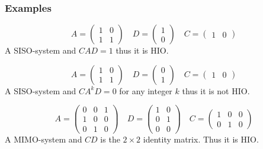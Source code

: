 \subsubsection{Examples}

\begin{example}{}{}
	\begin{equation}
	A = \begin{pmatrix}
	1 & 0 \\ 1 & 1
	\end{pmatrix}
	\quad
	D = \begin{pmatrix}
	1 \\ 0
	\end{pmatrix}
	\quad 
	C = \begin{pmatrix}
	1 & 0
	\end{pmatrix}
	\end{equation}
	A SISO-system and $CAD=1$ thus it is HIO.
\end{example}
\begin{example}{}{}
	\begin{equation}
	A = \begin{pmatrix}
	1 & 0 \\ 1 & 1
	\end{pmatrix}
	\quad
	D = \begin{pmatrix}
	0 \\ 1
	\end{pmatrix}
	\quad 
	C = \begin{pmatrix}
	1 & 0
	\end{pmatrix}
	\end{equation}
	A SISO-system and $CA^kD=0$ for any integer $k$ thus it is not HIO.
\end{example}
\begin{example}{}{}
	\begin{equation}
	A = \begin{pmatrix}
	0 & 0  & 1\\ 1 & 0 & 0 \\ 0 & 1 & 0
	\end{pmatrix}
	\quad
	D = \begin{pmatrix}
	1  & 0\\ 0 & 1 \\ 0 & 0
	\end{pmatrix}
	\quad 
	C = \begin{pmatrix}
	1 & 0 & 0 \\ 0 & 1 & 0
	\end{pmatrix}
	\end{equation}
	A MIMO-system and $CD$ is the $2\times 2$ identity matrix. Thus it is HIO.
\end{example}
